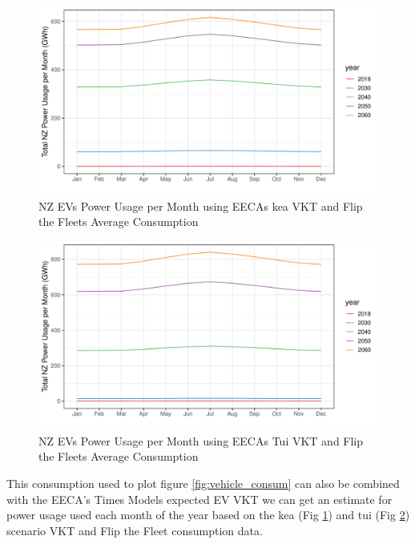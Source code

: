 \documentclass[
]{article}
\begin{document}
\begin{figure}
\centering
\includegraphics{summary_week4_files/figure-latex/kea_power_usage-1.pdf}
\caption{NZ EVs Power Usage per Month using EECAs kea VKT and Flip the
Fleets Average Consumption\label{fig:kea_power_usage}}
\end{figure}

\begin{figure}
\centering
\includegraphics{summary_week4_files/figure-latex/tui_power_usage-1.pdf}
\caption{NZ EVs Power Usage per Month using EECAs Tui VKT and Flip the
Fleets Average Consumption\label{fig:tui_power_usage}}
\end{figure}

This consumption used to plot figure \ref{fig:vehicle_consum} can also
be combined with the EECA's Times Models expected EV VKT we can get an
estimate for power usage used each month of the year based on the kea
(Fig \ref{fig:kea_power_usage}) and tui (Fig \ref{fig:tui_power_usage})
scenario VKT and Flip the Fleet consumption data.
\end{document}
